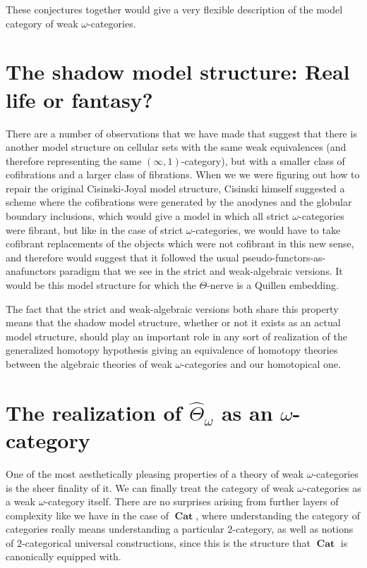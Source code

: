 \documentclass[a4paper,9pt]{amsart}
\theoremstyle{plain}   %
\theoremstyle{remark}
\theoremstyle{plain}
\DeclareMathOperator{\Cat}{\mathbf{Cat}}
\newcommand{\cat}[1]{{\operatorname{\mathbf{#1}}}}
\newcommand{\psh}[1]{\ensuremath{\widehat{#1}}}
\begin{document}
These conjectures together would give a very flexible description of the model category of weak \(\omega\)-categories.  

\section{The shadow model structure: Real life or fantasy?}

There are a number of observations that we have made that suggest that there is another model structure on cellular sets with the same weak equivalences (and therefore representing the same \((\infty,1)\)-category), but with a smaller class of cofibrations and a larger class of fibrations.  When we we were figuring out how to repair the original Cisinski-Joyal model structure, Cisinski himself suggested a scheme where the cofibrations were generated by the anodynes and the globular boundary inclusions, which would give a model in which all strict \(\omega\)-categories were fibrant, but like in the case of strict \(\omega\)-categories, we would have to take cofibrant replacements of the objects which were not cofibrant in this new sense, and therefore would suggest that it followed the usual pseudo-functors-as-anafunctors paradigm that we see in the strict and weak-algebraic versions.  It would be this model structure for which the \(\Theta\)-nerve is a Quillen embedding.  

The fact that the strict and weak-algebraic versions both share this property means that the shadow model structure, whether or not it exists as an actual model structure, should play an important role in any sort of realization of the generalized homotopy hypothesis giving an equivalence of homotopy theories between the algebraic theories of weak \(\omega\)-categories and our homotopical one.  
\section{The realization of $\psh{\Theta}_{\omega}$ as an \(\omega\)-category}

One of the most aesthetically pleasing properties of a theory of weak \(\omega\)-categories is the sheer finality of it.  We can finally treat the category of weak \(\omega\)-categories as a weak \(\omega\)-category itself.  There are no surprises arising from further layers of complexity like we have in the case of \(\cat{Cat}\), where understanding the category of categories really means understanding a particular \(2\)-category, as well as notions of \(2\)-categorical universal constructions, since this is the structure that \(\Cat\) is canonically equipped with.  
\end{document}

